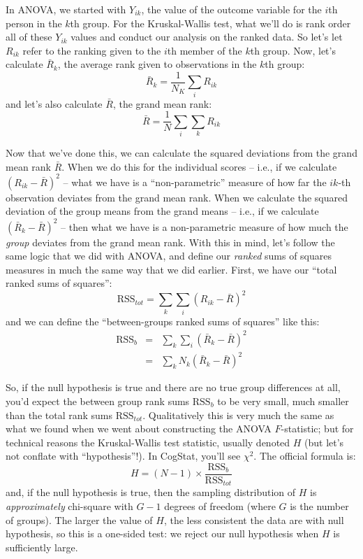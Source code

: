 \documentclass[
  11pt,
  a4paper,
  twoside,symmetric,openright]{book}
\theoremstyle{break}
\theoremstyle{break}
\begin{document}
In ANOVA, we started with \(Y_{ik}\), the value of the outcome variable for the \(i\)th person in the \(k\)th group. For the Kruskal-Wallis test, what we'll do is rank order all of these \(Y_{ik}\) values and conduct our analysis on the ranked data. So let's let \(R_{ik}\) refer to the ranking given to the \(i\)th member of the \(k\)th group. Now, let's calculate \(\bar{R}_k\), the average rank given to observations in the \(k\)th group:
\[
\bar{R}_k = \frac{1}{N_K} \sum_{i} R_{ik}
\]
and let's also calculate \(\bar{R}\), the grand mean rank:
\[
\bar{R} = \frac{1}{N} \sum_{i} \sum_{k} R_{ik}
\]

Now that we've done this, we can calculate the squared deviations from the grand mean rank \(\bar{R}\). When we do this for the individual scores -- i.e., if we calculate \((R_{ik} - \bar{R})^2\) -- what we have is a ``non-parametric'' measure of how far the \(ik\)-th observation deviates from the grand mean rank. When we calculate the squared deviation of the group means from the grand means -- i.e., if we calculate \((\bar{R}_k - \bar{R} )^2\) -- then what we have is a non-parametric measure of how much the \emph{group} deviates from the grand mean rank. With this in mind, let's follow the same logic that we did with ANOVA, and define our \emph{ranked} sums of squares measures in much the same way that we did earlier. First, we have our ``total ranked sums of squares'':
\[
\mbox{RSS}_{tot} = \sum_k \sum_i ( R_{ik} - \bar{R} )^2
\]
and we can define the ``between-groups ranked sums of squares'' like this:
\[
\begin{array}{rcl}
\mbox{RSS}_{b} &=& \sum_k \sum_i ( \bar{R}_k  - \bar{R} )^2 \\
&=& \sum_k N_k ( \bar{R}_k  - \bar{R} )^2 
\end{array}
\]

So, if the null hypothesis is true and there are no true group differences at all, you'd expect the between group rank sums \(\mbox{RSS}_{b}\) to be very small, much smaller than the total rank sums \(\mbox{RSS}_{tot}\). Qualitatively this is very much the same as what we found when we went about constructing the ANOVA \(F\)-statistic; but for technical reasons the Kruskal-Wallis test statistic, usually denoted \(H\) (but let's not conflate with ``hypothesis''!). In CogStat, you'll see \(\chi^2\). The official formula is:
\[
H = (N - 1) \times \frac{\mbox{RSS}_b}{\mbox{RSS}_{tot}}
\]
and, if the null hypothesis is true, then the sampling distribution of \(H\) is \emph{approximately} chi-square with \(G-1\) degrees of freedom (where \(G\) is the number of groups). The larger the value of \(H\), the less consistent the data are with null hypothesis, so this is a one-sided test: we reject our null hypothesis when \(H\) is sufficiently large.
\end{document}
